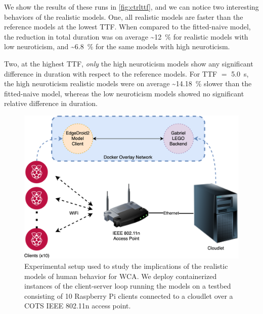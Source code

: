 We show the results of these runs in \cref{fig:ctrlttf}, and we can notice two interesting behaviors of the realistic models.
One, all realistic models are faster than the reference models at the lowest \ac{TTF}.
When compared to the fitted-naive model, the reduction in total duration was on average \textasciitilde\SI{12}{\percent} for realistic models with low neuroticism, and \textasciitilde\SI{6.8}{\percent} for the same models with high neuroticism.

Two, at the highest \ac{TTF}, \emph{only} the high neuroticism models show any significant difference in duration with respect to the reference models.
For \ac{TTF} \(=\) \SI{5.0}{s}, the high neuroticism realistic models were on average \textasciitilde\SI{14.18}{\percent} slower than the fitted-naive model, whereas the low neuroticism models showed no significant relative difference in duration.


\begin{figure}
    \centering
    \includegraphics[width=\columnwidth]{figs/EdgeDroid2ExperimentalSetup.png}
    \caption{%
        Experimental setup used to study the implications of the realistic models of human behavior for \ac{WCA}.
        We deploy containerized instances of the client-server loop running the models on a testbed consisting of \num{10} Raspberry Pi clients connected to a cloudlet over a \ac{COTS} \acs{IEEE} \num{802.11}n access point.
    }\label{fig:expsetup}
\end{figure}

